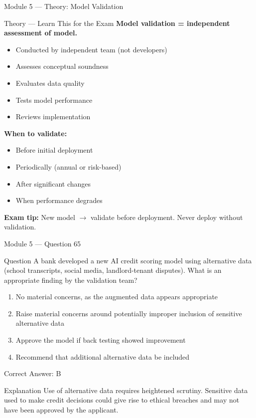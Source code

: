 \documentclass[aspectratio=169,10pt]{beamer}
\newcommand{\question}[1]{%
	\begin{block}{Question}
		#1
	\end{block}
}
\newcommand{\options}[4]{%
	\begin{enumerate}[label=\Alph*.,leftmargin=*]
		\item #1
		\item #2
		\item #3
		\item #4
	\end{enumerate}
}
\newcommand{\answerbox}[1]{%
	\begin{exampleblock}{Correct Answer: #1}
	\end{exampleblock}
}
\newcommand{\explain}[1]{%
	\begin{block}{Explanation}
		\small #1
	\end{block}
}
\newcommand{\theory}[1]{%
	\begin{block}{Theory --- Learn This for the Exam}
		\small #1
	\end{block}
}
\begin{document}
	\begin{frame}{Module 5 --- Theory: Model Validation}
		\theory{
			\textbf{Model validation = independent assessment of model.}
			\begin{itemize}
				\item Conducted by independent team (not developers)
				\item Assesses conceptual soundness
				\item Evaluates data quality
				\item Tests model performance
				\item Reviews implementation
			\end{itemize}
			\textbf{When to validate:}
			\begin{itemize}
				\item Before initial deployment
				\item Periodically (annual or risk-based)
				\item After significant changes
				\item When performance degrades
			\end{itemize}
			\textbf{Exam tip:} New model $\rightarrow$ validate before deployment. Never deploy without validation.
		}
	\end{frame}
	
	\begin{frame}{Module 5 --- Question 65}
		\question{A bank developed a new AI credit scoring model using alternative data (school transcripts, social media, landlord-tenant disputes). What is an appropriate finding by the validation team?}
		\options{No material concerns, as the augmented data appears appropriate}{Raise material concerns around potentially improper inclusion of sensitive alternative data}{Approve the model if back testing showed improvement}{Recommend that additional alternative data be included}
		\answerbox{B}
		\explain{Use of alternative data requires heightened scrutiny. Sensitive data used to make credit decisions could give rise to ethical breaches and may not have been approved by the applicant.}
	\end{frame}
	
\end{document}

